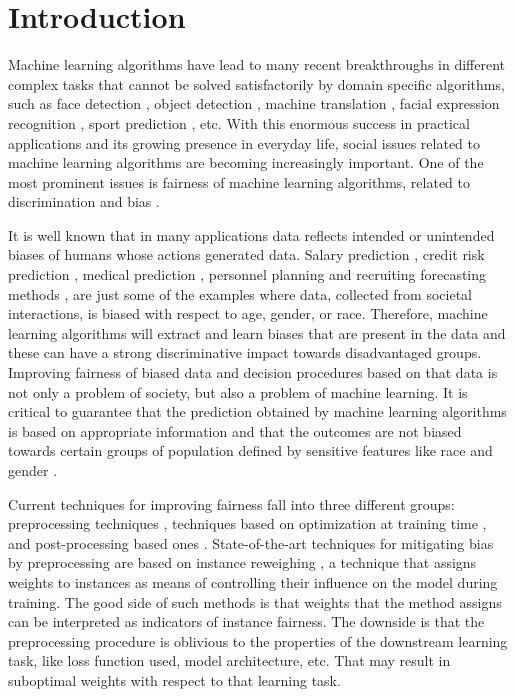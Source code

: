 \documentclass[preprint,12pt]{elsarticle}
\begin{document}

\section{Introduction}
\label{Sec:Introduction}
Machine learning algorithms have lead to many recent breakthroughs in different complex tasks that cannot be solved satisfactorily by domain specific algorithms, such as face detection \cite{kumar2019face}, object detection \cite{voulodimos2018deep}, machine translation \cite{singh2017machine}, facial expression recognition
\cite{domadiya2019review}, sport prediction \cite{bunker2019machine}, etc. With this enormous success in practical applications and its growing presence in everyday life, social issues related to machine learning algorithms are becoming increasingly important. One of the most prominent issues is fairness of machine learning algorithms, related to discrimination and bias \cite{hajian2016algorithmic}.

It is well known that in many applications data reflects intended or unintended biases of humans whose actions generated data. Salary prediction \cite{innocenti2016mining}, credit risk prediction \cite{li2019credit}, medical prediction \cite{boyd1996relationship}, personnel planning and recruiting forecasting methods \cite{kim2016data}, are just some of the examples where data, collected from societal interactions, is biased with respect to age, gender, or race. Therefore, machine learning algorithms will extract and learn biases that are present in the data and these can have a strong discriminative impact towards disadvantaged groups.
Improving fairness of biased data and decision procedures based on that data is not only a problem of society, but also a problem of machine learning.  It is critical to guarantee that the prediction obtained by machine learning algorithms is based on appropriate information and that the outcomes are not biased towards certain groups of population defined by sensitive features like race and gender \cite{wang2019approaching}.

Current techniques for improving fairness fall into three different groups: preprocessing techniques \cite{kamiran2012decision,calmon2017optimized}, techniques based on optimization at training time \cite{zafar2019fairness,adel2019one,celis2019classification,kamishima2012fairness}, and post-processing based ones \cite{hardt2016equality, pleiss2017fairness}. State-of-the-art techniques for mitigating bias by preprocessing are based on instance reweighing \cite{kamiran2012data}, a technique that assigns weights to instances as means of controlling their influence on the model during training. The good side of such methods is that weights that the method assigns can be interpreted as indicators of instance fairness. The downside is that the preprocessing procedure is oblivious to
the properties of the downstream learning task, like loss function used, model architecture, etc. That may result in suboptimal weights with respect to that learning task.
\end{document}
